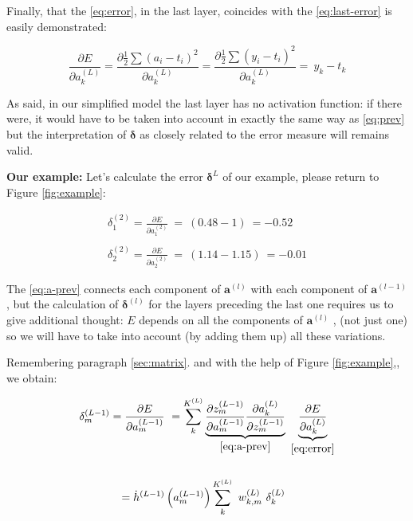 \documentclass{article}
\begin{document}
Finally, that the \eqref{eq:error}, in the last layer, coincides with the \eqref{eq:last-error} is easily demonstrated:

\begin{equation*}
\frac{\partial E}{\partial a_{k}^{( L)}} 
=\frac{\partial \frac{1}{2}\sum ( a_{i} -t_{i})^{2}}{\partial a_{k}^{( L)}} 
=\frac{\partial \frac{1}{2}\sum ( y_{i} -t_{i})^{2}}{\partial a_{k}^{( L)}} 
=\ y_{k} -t_{k}
\end{equation*}


\begin{tcolorbox}[colback=gray!10, colframe=gray!50, title=Please note:]
As said, in our simplified model the last layer has no activation function: if there were, it would have to be taken into account in exactly the same way as \eqref{eq:prev} but the interpretation of $\boldsymbol{\delta}$ as closely related to the error measure will remains valid.
\end{tcolorbox}

\textbf{Our example:} Let's calculate the error $\boldsymbol{\delta}^{L}$ of our example, please return to  Figure \ref{fig:example}:

\begin{gather*}
\delta _{1}^{( 2)} =\frac{\partial E}{\partial a_{1}^{( 2)}} \ =\ ( 0.48-1) \ =-0.52\ \ \\
\\
\delta _{2}^{( 2)} =\frac{\partial E}{\partial a_{2}^{( 2)}} \ =\ ( 1.14-1.15) \ =-0.01
\end{gather*}

\begin{center}\textleaf\end{center}


The \eqref{eq:a-prev} connects each component of $\boldsymbol{a}^{(l)}$ with each component of $\boldsymbol{a}^{(l-1)}$ , but the calculation of $\boldsymbol{\delta}^{(l)}$ for the layers preceding the last one requires us to give additional thought: $E$ depends on all the components of $\boldsymbol{a}^{(l)}$ , (not just one) so we will have to take into account (by adding them up) all these variations.

Remembering paragraph \ref{sec:matrix}. and with the help of Figure \ref{fig:example},, we obtain:

\begin{gather*}
\delta _{m}^{( L-1)} =\frac{\partial E}{\partial a_{m}^{( L-1)}} \ =\sum _{k}^{K^{( L)}}
\underbrace{\frac{\partial z_{m}^{( L-1)}}{\partial a_{m}^{( L-1)}}\frac{\partial a_{k}^{( L)}}{\partial z_{m}^{( L-1)}}}_{\eqref{eq:a-prev}} \ 
\underbrace{\frac{\partial E}{\partial a_{k}^{( L)}}}_{\eqref{eq:error}}\\
\\
=\dot{h}^{( L-1)}\left( a_{m}^{( L-1)}\right)\sum _{k}^{K^{( L)}} \ w_{k,m}^{( L)} \ \delta _{k}^{( L)} \ \ \\
\end{gather*}
\end{document}
